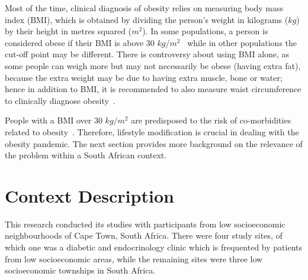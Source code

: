 Most of the time, clinical diagnosis of obesity relies on measuring body mass index (BMI), which is obtained by dividing the person’s weight in kilograms ($kg$) by their height in metres squared ($m^2$). In some populations, a person is considered obese if their BMI is above 30 $kg/m^2$~\citep{steyn2006chronic} while in other populations the cut-off point may be different. There is controversy about using BMI alone, as some people can weigh more but may not necessarily be obese (having extra fat), because the extra weight may be due to having extra muscle, bone or water; hence in addition to BMI, it is recommended to also measure waist circumference to clinically diagnose obesity~\citep{janssen2004waist}. 

People with a BMI over 30 $kg/m^2$ are predisposed to the risk of co-morbidities related to obesity~\citep{de2000clinical}. Therefore, lifestyle modification is crucial in dealing with the obesity pandemic. The next section provides more background on the relevance of the problem within a South African context.
\section{Context Description}
This research conducted its studies with participants from low socioeconomic neighbourhoods of Cape Town, South Africa. There were four study sites, of which one was a diabetic and endocrinology clinic which is frequented by patients from low socioeconomic areas, while the remaining sites were three low socioeconomic townships in South Africa. 

